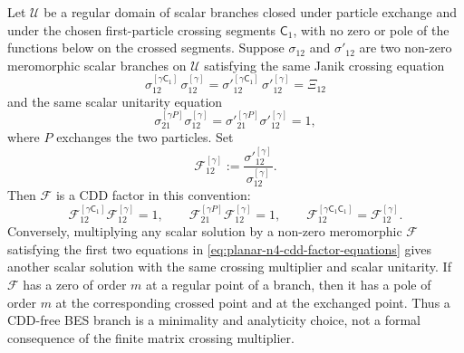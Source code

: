 \begin{proposition}
\label{prop:planar-n4-crossing-cdd-ambiguity}
Let \(\mathcal U\) be a regular domain of scalar branches closed under
particle exchange and under the chosen first-particle crossing segments
\(\mathsf C_1\), with no zero or pole of the functions below on the crossed
segments.  Suppose \(\sigma_{12}\) and \(\sigma'_{12}\) are two non-zero
meromorphic scalar branches on \(\mathcal U\) satisfying the same Janik
crossing equation
\[
  \sigma^{[\gamma\mathsf C_1]}_{12}\,
  \sigma^{[\gamma]}_{12}
  =
  \sigma'^{[\gamma\mathsf C_1]}_{12}\,
  \sigma'^{[\gamma]}_{12}
  =
  \Xi_{12}
\]
and the same scalar unitarity equation
\[
  \sigma^{[\gamma P]}_{21}\sigma^{[\gamma]}_{12}
  =
  \sigma'^{[\gamma P]}_{21}\sigma'^{[\gamma]}_{12}
  =1,
\]
where \(P\) exchanges the two particles.  Set
\[
  \mathcal F^{[\gamma]}_{12}
  :=
  \frac{\sigma'^{[\gamma]}_{12}}{\sigma^{[\gamma]}_{12}} .
\]
Then \(\mathcal F\) is a CDD factor in this convention:
\begin{equation}
  \mathcal F^{[\gamma\mathsf C_1]}_{12}
  \mathcal F^{[\gamma]}_{12}=1,\qquad
  \mathcal F^{[\gamma P]}_{21}
  \mathcal F^{[\gamma]}_{12}=1,\qquad
  \mathcal F^{[\gamma\mathsf C_1\mathsf C_1]}_{12}
  =
  \mathcal F^{[\gamma]}_{12}.
  \label{eq:planar-n4-cdd-factor-equations}
\end{equation}
Conversely, multiplying any scalar solution by a non-zero meromorphic
\(\mathcal F\) satisfying the first two equations in
\eqref{eq:planar-n4-cdd-factor-equations} gives another scalar solution with
the same crossing multiplier and scalar unitarity.  If \(\mathcal F\) has a
zero of order \(m\) at a regular point of a branch, then it has a pole of
order \(m\) at the corresponding crossed point and at the exchanged point.
Thus a CDD-free BES branch is a minimality and analyticity choice, not a
formal consequence of the finite matrix crossing multiplier.
\end{proposition}

